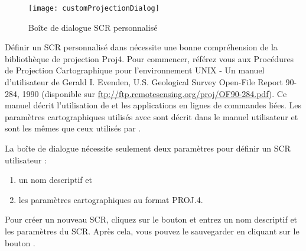 \begin{figure}[ht]
   \begin{center}
   \texttt{[image: customProjectionDialog]}
   \caption{Boîte de dialogue SCR  personnalisé\nixcaption} \label{fig:customprojections}
\end{center}  
\end{figure}

Définir un SCR personnalisé dans \qg nécessite une bonne compréhension de la bibliothèque de projection Proj4. Pour commencer, référez vous aux Procédures de Projection Cartographique pour l'environnement UNIX - Un manuel d'utilisateur de Gerald I. Evenden, U.S. Geological Survey Open-File Report 90-284, 1990 (disponible sur \url{ftp://ftp.remotesensing.org/proj/OF90-284.pdf}).
Ce manuel décrit l'utilisation de  et les applications en lignes de commandes liées. Les paramètres cartographiques utilisés avec  sont décrit dans le manuel utilisateur et sont les mêmes que ceux utilisés par \qg.

La boîte de dialogue  nécessite seulement deux paramètres pour définir un  SCR utilisateur :
\begin{enumerate}
\item un nom descriptif et
\item les paramètres cartographiques au format PROJ.4.
\end{enumerate}
Pour créer un nouveau SCR, cliquez sur le bouton   et entrez un nom descriptif et les paramètres du SCR. Après cela, vous pouvez  le sauvegarder en cliquant sur le bouton .

